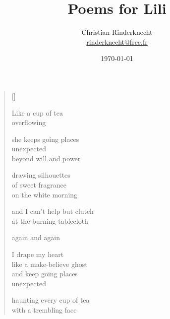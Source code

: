 \documentclass[12pt,a4paper]{article}
\title{Poems for Lili}
\author{Christian Rinderknecht\\
{\small \url{rinderknecht@free.fr}}}
\date{\today}
\begin{document}

\thispagestyle{empty}

\poemtitle{}

\settowidth{\versewidth}{Like a make-believe ghost}

\bigskip

\begin{verse}[\versewidth]

Like a cup of tea \\
overflowing

she keeps going places \\
unexpected \\
beyond will and power

drawing silhouettes \\
of sweet fragrance \\
on the white morning

and I can't help but clutch \\
at the burning tablecloth

again and again

I drape my heart \\
like a make-believe ghost \\
and keep going places \\
unexpected

haunting every cup of tea \\
with a trembling face
\end{verse}
\end{document}
